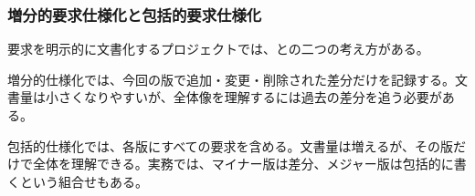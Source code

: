 \subsubsection{増分的要求仕様化と包括的要求仕様化}

要求を明示的に文書化するプロジェクトでは、との二つの考え方がある。

増分的仕様化では、今回の版で追加・変更・削除された差分だけを記録する。文書量は小さくなりやすいが、全体像を理解するには過去の差分を追う必要がある。

包括的仕様化では、各版にすべての要求を含める。文書量は増えるが、その版だけで全体を理解できる。実務では、マイナー版は差分、メジャー版は包括的に書くという組合せもある。
